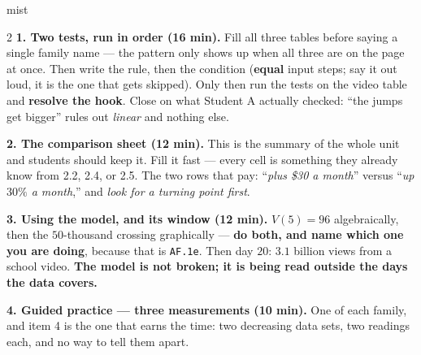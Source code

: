\documentclass[10pt]{article}
\begin{document}
\boxguard
\begin{skillbox}[Lesson]{mist}
\begin{multicols}{2}
\textbf{1. Two tests, run in order (16 min).} Fill all three tables before saying a single family
name --- the pattern only shows up when all three are on the page at once. Then write the rule, then
the condition (\textbf{equal} input steps; say it out loud, it is the one that gets skipped). Only
then run the tests on the video table and \textbf{resolve the hook}. Close on what Student A actually
checked: ``the jumps get bigger'' rules out \emph{linear} and nothing else.

\textbf{2. The comparison sheet (12 min).} This is the summary of the whole unit and students should
keep it. Fill it fast --- every cell is something they already know from 2.2, 2.4, or 2.5. The two
rows that pay: ``\emph{plus \$30 a month}'' versus ``\emph{up $30\%$ a month},'' and \emph{look for a
turning point first}.

\textbf{3. Using the model, and its window (12 min).} $V(5)=96$ algebraically, then the $50$-thousand
crossing graphically --- \textbf{do both, and name which one you are doing}, because that is
\texttt{AF.1e}. Then day $20$: $3.1$ billion views from a school video. \textbf{The model is not
broken; it is being read outside the days the data covers.}

\textbf{4. Guided practice --- three measurements (10 min).} One of each family, and item 4 is the one
that earns the time: two decreasing data sets, two readings each, and no way to tell them apart.
\end{multicols}
\end{skillbox}
\end{document}
